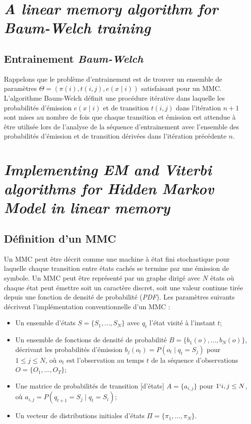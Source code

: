 \documentclass[a4paper, 11pt]{article}
\newcommand{\pinit}{\pi (i)}
\newcommand{\ptrans}{t(i,j)}
\newcommand{\pemi}{e(x\mid i)}
\begin{document}
\section{\textit{A linear memory algorithm for Baum-Welch training}}
\subsection{Entrainement \textit{Baum-Welch}}
Rappelons que le problème d'entrainement est de trouver un ensemble de paramètres $\Theta = (\pinit,\ptrans,\pemi)$ satisfaisant pour un MMC.
L'algorithme Baum-Welch définit une procédure itérative dans laquelle les probabilités d'émission $\pemi$ et de transition $\ptrans$ dans l'itération $n+1$ sont mises au nombre de fois que chaque transition et émission est attendue à être utilisée lors de l'analyse de la séquence d'entrainement avec l'ensemble des probabilités d'émission et de transition dérivées dans l'itération précédente $n$.

\section{\textit{Implementing EM and Viterbi algorithms for Hidden Markov Model in linear memory}}
\subsection{Définition d'un MMC}
Un MMC peut être décrit comme une machine à état fini stochastique pour laquelle chaque transition entre états cachés se termine par une émission de symbole. Un MMC peut être représenté par un graphe dirigé avec $N$ états où chaque état peut émettre soit un caractère discret, soit une valeur continue tirée depuis une fonction de densité de probabilité (\textit{PDF}). Les paramètres suivants décrivent l'implémentation conventionnelle d'un MMC :
\begin{itemize}
	\item Un ensemble d'états $S=\{S_1,\dotsc ,S_N\}$ avec $q_t$ l'état visité à l'instant $t$;
	\item Un ensemble de fonctions de densité de probabilité $B = \{b_1(o),\dotsc ,b_N(o)\}$, décrivant les probabilités d'émission $b_j(o_t) = P(o_t \mid q_t = S_j)$ pour $1\leq j\leq N$, où $o_t$ est l'observation au temps $t$ de la séquence d'observations $O=\{O_1,\dotsc ,O_T\}$;
	\item Une matrice de probabilités de transition [d'états] $A = \{a_{i, j}\}$ pour $1\lq i, j \leq N$, où $a_{i, j}=P(q_{t+1} = S_j \mid q_t = S_i)$;
	\item Un vecteur de distributions initiales d'états $\Pi = \{\pi_1,\dotsc ,\pi_N\}$.
\end{itemize}
\end{document}
